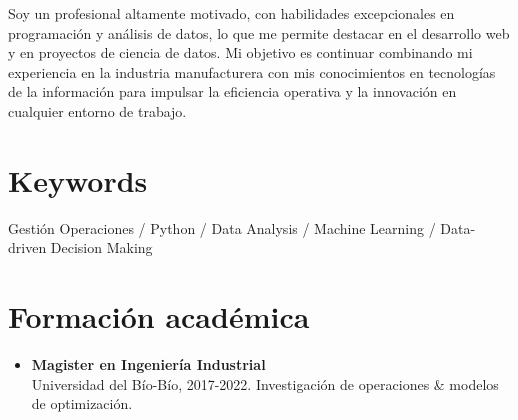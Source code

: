 \documentclass[a4paper,10pt]{article}
\begin{document}
Soy un profesional altamente motivado, con habilidades excepcionales en programación y análisis de datos, lo que me permite destacar en el desarrollo web y en proyectos de  ciencia de datos. Mi objetivo es continuar combinando mi experiencia en la industria manufacturera con mis conocimientos en tecnologías de la información para impulsar la eficiencia operativa y la innovación en cualquier entorno de trabajo.
	
	
	\section*{Keywords}
	\small
	Gestión Operaciones / Python / Data Analysis / Machine Learning /  Data-driven Decision Making
	
	\section*{Formación académica}
	\begin{itemize}[left=0pt]
		\item \textbf{Magister en Ingeniería Industrial} \\
		Universidad del Bío-Bío, 2017-2022. Investigación de operaciones \& modelos de optimización.
		
		
	\end{itemize}
	
	
	
\end{document}
